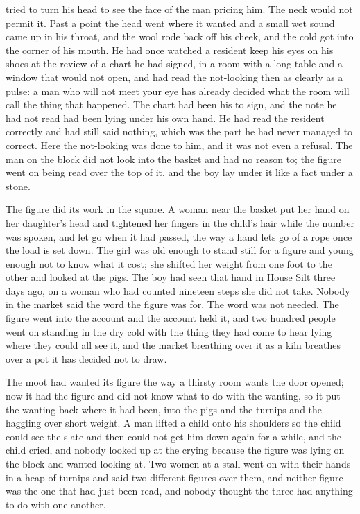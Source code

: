  tried to turn his head to see the face of the man pricing him. The neck would not permit it. Past a point the head went where it wanted and a small wet sound came up in his throat, and the wool rode back off his cheek, and the cold got into the corner of his mouth. He had once watched a resident keep his eyes on his shoes at the review of a chart he had signed, in a room with a long table and a window that would not open, and had read the not-looking then as clearly as a pulse: a man who will not meet your eye has already decided what the room will call the thing that happened. The chart had been his to sign, and the note he had not read had been lying under his own hand. He had read the resident correctly and had still said nothing, which was the part he had never managed to correct. Here the not-looking was done to him, and it was not even a refusal. The man on the block did not look into the basket and had no reason to; the figure went on being read over the top of it, and the boy lay under it like a fact under a stone.

\scenebreak

The figure did its work in the square. A woman near the basket put her hand on her daughter's head and tightened her fingers in the child's hair while the number was spoken, and let go when it had passed, the way a hand lets go of a rope once the load is set down. The girl was old enough to stand still for a figure and young enough not to know what it cost; she shifted her weight from one foot to the other and looked at the pigs. The boy had seen that hand in House Silt three days ago, on a woman who had counted nineteen steps she did not take. Nobody in the market said the word the figure was for. The word was not needed. The figure went into the account and the account held it, and two hundred people went on standing in the dry cold with the thing they had come to hear lying where they could all see it, and the market breathing over it as a kiln breathes over a pot it has decided not to draw.

The moot had wanted its figure the way a thirsty room wants the door opened; now it had the figure and did not know what to do with the wanting, so it put the wanting back where it had been, into the pigs and the turnips and the haggling over short weight. A man lifted a child onto his shoulders so the child could see the slate and then could not get him down again for a while, and the child cried, and nobody looked up at the crying because the figure was lying on the block and wanted looking at. Two women at a stall went on with their hands in a heap of turnips and said two different figures over them, and neither figure was the one that had just been read, and nobody thought the three had anything to do with one another.

